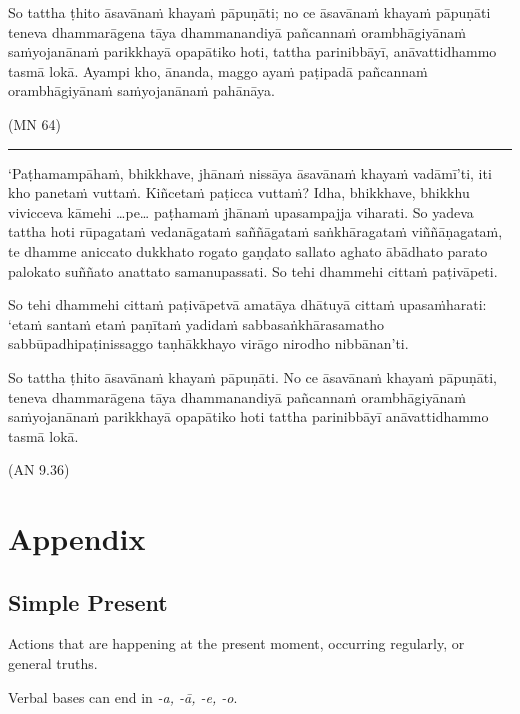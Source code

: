 \documentclass[11pt,oneside]{memoir}
\begin{document}
So tattha ṭhito āsavānaṁ khayaṁ pāpuṇāti; no ce āsavānaṁ khayaṁ pāpuṇāti teneva
dhammarāgena tāya dhammanandiyā pañcannaṁ orambhāgiyānaṁ saṁyojanānaṁ parikkhayā
opapātiko hoti, tattha parinibbāyī, anāvattidhammo tasmā lokā. Ayampi kho,
ānanda, maggo ayaṁ paṭipadā pañcannaṁ orambhāgiyānaṁ saṁyojanānaṁ pahānāya.

(MN 64)

\noindent\rule{\textwidth}{0.5pt}

‘Paṭhamampāhaṁ, bhikkhave, jhānaṁ nissāya āsavānaṁ khayaṁ vadāmī’ti, iti kho
panetaṁ vuttaṁ. Kiñcetaṁ paṭicca vuttaṁ? Idha, bhikkhave, bhikkhu vivicceva
kāmehi …pe… paṭhamaṁ jhānaṁ upasampajja viharati. So yadeva tattha hoti
rūpagataṁ vedanāgataṁ saññāgataṁ saṅkhāragataṁ viññāṇagataṁ, te dhamme aniccato
dukkhato rogato gaṇḍato sallato aghato ābādhato parato palokato suññato anattato
samanupassati. So tehi dhammehi cittaṁ paṭivāpeti.

So tehi dhammehi cittaṁ paṭivāpetvā amatāya dhātuyā cittaṁ upasaṁharati: ‘etaṁ
santaṁ etaṁ paṇītaṁ yadidaṁ sabbasaṅkhārasamatho sabbūpadhipaṭinissaggo
taṇhākkhayo virāgo nirodho nibbānan’ti.

So tattha ṭhito āsavānaṁ khayaṁ pāpuṇāti. No ce āsavānaṁ khayaṁ
pāpuṇāti, teneva dhammarāgena tāya dhammanandiyā pañcannaṁ orambhāgiyānaṁ
saṁyojanānaṁ parikkhayā opapātiko hoti tattha parinibbāyī anāvattidhammo tasmā
lokā.

(AN 9.36)

\chapter{Appendix}
\label{sec:orgd51f0d5}
\section{Simple Present}
\label{sec:org6bbe9bd}

Actions that are happening at the present moment, occurring regularly, or general truths.

Verbal bases can end in \emph{-a, -ā, -e, -o}.
\end{document}
